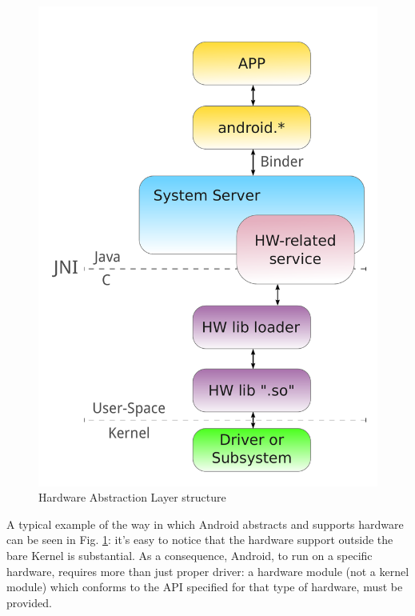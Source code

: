 \begin{itemize}
\begin{figure}[!htb]
	\includegraphics[scale=.25]{images/hal.pdf}
	\caption{Hardware Abstraction Layer structure}
	\label{fig:hal}
\end{figure}
A typical example of the way in which Android abstracts and supports hardware can be seen in Fig. \ref{fig:hal}: it's easy to notice that the hardware support outside the bare Kernel is substantial. As a consequence, Android, to run on a specific hardware, requires more than just proper driver: a hardware module (not a kernel module) which conforms to the API specified for that type of hardware, must be provided.
\end{itemize}